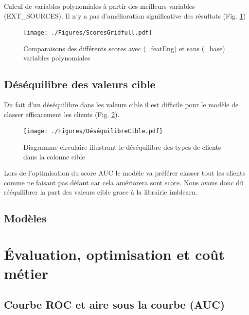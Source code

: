 \documentclass[12pt, a4paper]{article}
\begin{document}
Calcul de variables polynomiales à partir des meilleurs variables (EXT\_SOURCES).
Il n'y a pas d'amélioration significative des résultats (Fig. \ref{fig:ScoresGridFull})

\begin{figure}[h]
    \begin{center}
        \texttt{[image: ./Figures/ScoresGridfull.pdf]}
    \end{center}
    \caption{Comparaisons des différents scores avec (\_featEng) et sans (\_base) variables polynomiales}
    \label{fig:ScoresGridFull}
\end{figure}

\subsection{Déséquilibre des valeurs cible}

Du fait d'un déséquilibre dans les valeurs cible il est difficile pour le modèle de classer efficacement les clients (Fig. \ref{fig:DéséquilibreCible}).

\begin{figure}[h]
    \begin{center}
        \texttt{[image: ./Figures/DéséquilibreCible.pdf]}
    \end{center}
    \caption{Diagramme circulaire illustrant le déséquilibre des types de clients dans la colonne cible}
    \label{fig:DéséquilibreCible}
\end{figure}

Lors de l'optimisation du score AUC le modèle va préférer classer tout les clients comme ne faisant pas défaut car cela amériorera sont score.
Nous avons donc dû rééquilibrer la part des valeurs cible grace à la librairie imblearn.

\subsection{Modèles}



\section{Évaluation, optimisation et coût métier}

\subsection{Courbe ROC et aire sous la courbe (AUC)}
\end{document}

